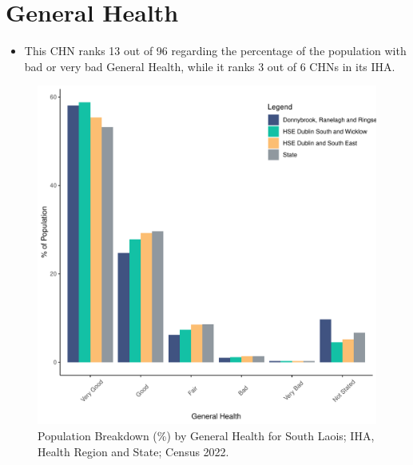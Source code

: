 \documentclass{article}
\begin{document}
\pagebreak

\section{General Health}\label{sect:GenHealth}
\begin{itemize}
\item  This CHN ranks  13 out of 96 regarding the percentage of the population with bad or very bad General Health, while it ranks   3 out of 6 CHNs in its IHA.
\end{itemize}
\begin{figure}[h]
	\centering
	\includegraphics[width = 150mm]{../figures/GenED.pdf}
	\caption{Population Breakdown (\%) by General Health for South Laois; IHA, Health Region and State;  Census 2022.}
	\label{fig:2ae19629-1a6a-13a3-e055-000000000001}
	\end{figure}
\end{document}
